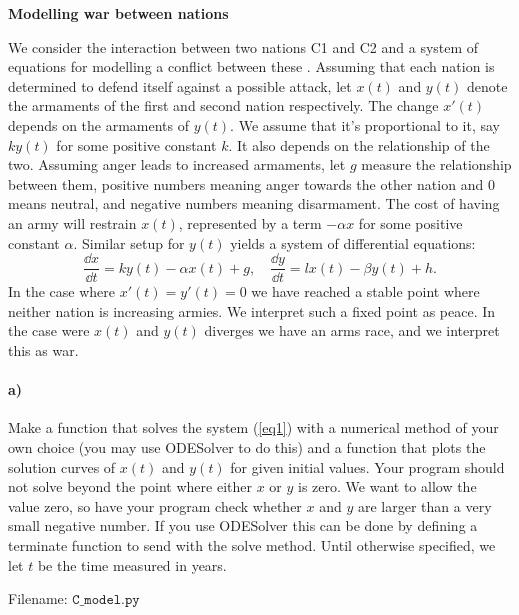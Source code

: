 \begin{Problem}{\textbf{Modelling war between nations}}

\noindent We consider the interaction between two nations C1 and C2 and
a system of equations for modelling a conflict between these \cite[p.396]{braun}.
Assuming that each nation is determined  to defend itself against a possible attack,
let $x(t)$ and $y(t)$ denote the armaments of
the first and second nation respectively. The change $x'(t)$ depends on the armaments of
$y(t)$. We assume that it's proportional to it, say $k y(t)$ for some positive constant
$k$. It also depends on the relationship of the two. Assuming anger
leads to increased armaments, let $g$ measure the relationship between them, positive
numbers meaning anger towards the other nation and 0 means neutral, and negative
numbers meaning disarmament.
The cost of having an army will restrain $x(t)$, represented by
a term $-\alpha x$ for some positive constant $\alpha$. Similar setup for $y(t)$ yields a
system of differential equations:
\begin{equation} \label{eq1}
    \frac{\dd x}{\dd t} = ky(t)-\alpha x(t) + g, \quad
    \frac{\dd y}{\dd t} = lx(t)-\beta y(t)+h.
\end{equation}
In the case where $x'(t)=y'(t)=0$ we have reached a stable point where neither
nation is increasing armies. We interpret such a fixed point as peace. In the case were $x(t)$
and $y(t)$ diverges we have an arms race, and we interpret this as war.

\paragraph{a)}
Make a function that solves the system (\ref{eq1}) with a numerical method
of your own choice (you may use ODESolver to do this) and a function that
plots the solution curves of $x(t)$ and $y(t)$ for given initial values.
Your program should not solve beyond the point where either $x$ or $y$ is zero.
We want to allow the value zero,
so have your program check whether $x$ and $y$ are larger than a very small negative number.
If you use ODESolver this can be done by defining a terminate function to send
with the solve method. Until otherwise specified, we let $t$ be the time measured in years.

Filename: $\texttt{C\_model.py}$


\end{Problem}
